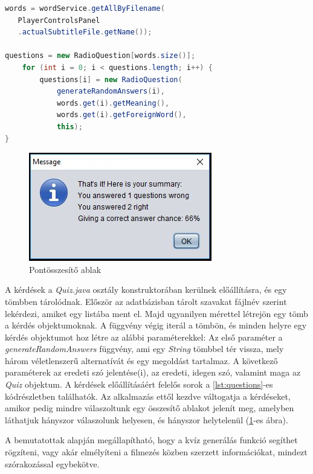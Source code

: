 \begin{spacing}{1.25}
\begin{lstlisting}[caption=Kérdések előállítása, language=java, label={lst:questions}]
words = wordService.getAllByFilename(
   PlayerControlsPanel
   .actualSubtitleFile.getName());

questions = new RadioQuestion[words.size()];
    for (int i = 0; i < questions.length; i++) {
        questions[i] = new RadioQuestion(
            generateRandomAnswers(i),
            words.get(i).getMeaning(),
            words.get(i).getForeignWord(),
            this);
}
\end{lstlisting}
\end{spacing}

  \begin{figure}[h!]
\centering
  \includegraphics[width=.5\linewidth]{images/summary.jpg}
  \caption{Pontösszesítő ablak}
  \label{fig:summary}
\end{figure}

 A kérdések a \textit{Quiz.java} osztály konstruktorában kerülnek előállításra, és egy tömbben tárolódnak. Először az adatbázisban tárolt szavakat fájlnév szerint lekérdezi, amiket egy listába ment el. Majd ugyanilyen mérettel létrejön egy tömb a kérdés objektumoknak. A függvény végig iterál a tömbön, és minden helyre egy kérdés objektumot hoz létre az alábbi paraméterekkel: Az első paraméter a \textit{generateRandomAnswers} függvény, ami egy \textit{String} tömbbel tér vissza, mely három véletlenszerű alternatívát és egy megoldást tartalmaz. A következő paraméterek az eredeti szó jelentése(i), az eredeti, idegen szó, valamint maga az \textit{Quiz} objektum. A kérdések előállításáért felelős sorok a \ref{lst:questions}-es kódrészletben találhatók. Az alkalmazás ettől kezdve váltogatja a kérdéseket, amikor pedig mindre válaszoltunk egy összesítő ablakot jelenít meg, amelyben láthatjuk hányszor válaszolunk helyesen, és hányszor helytelenül (\ref{fig:summary}-es ábra).
 

A bemutatottak alapján megállapítható, hogy a kvíz generálás funkció segíthet rögzíteni, vagy akár elmélyíteni a filmezés közben szerzett információkat, mindezt szórakozással egybekötve.
